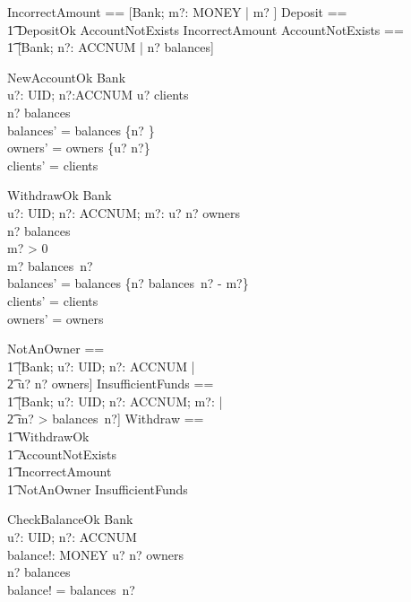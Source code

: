 \documentclass{article}
\begin{document}
\begin{zed}
IncorrectAmount == [\Xi Bank; m?: MONEY | m? ] \also
Deposit == \\
  \t1 DepositOk \lor AccountNotExists \lor IncorrectAmount \also
AccountNotExists == \\
  \t1 [\Xi Bank; n?: ACCNUM | n? \notin \dom balances] \also
\end{zed}

\begin{schema}{NewAccountOk}
\Delta Bank \\
u?: UID; 
n?:ACCNUM
\where
u? \in \dom clients \\
n? \notin \dom balances \\
balances' = balances \cup \{n? \} \\
owners' = owners \cup \{u? \mapsto n?\} \\
clients' = clients
\end{schema}

\begin{schema}{WithdrawOk}
\Delta Bank \\
u?: UID; 
n?: ACCNUM; 
m?: \nat
\where
u? \mapsto n? \in owners \\
n? \in \dom balances \\
m? > 0 \\
m? \leq balances~n? \\
balances' = balances \oplus \{n? \mapsto balances~n? - m?\} \\
clients' = clients \\
owners' = owners
\end{schema}

\begin{zed}
NotAnOwner == \\
  \t1 [\Xi Bank; u?: UID; n?: ACCNUM | \\
    \t2 u? \mapsto n? \notin owners] \also
InsufficientFunds == \\
  \t1 [\Xi Bank; u?: UID; n?: ACCNUM; m?: \nat | \\
    \t2 m? > balances~n?] \also
Withdraw == \\
  \t1 WithdrawOk \\
  \t1 \lor AccountNotExists \\ 
  \t1 \lor IncorrectAmount \\
  \t1 \lor NotAnOwner \lor InsufficientFunds
\end{zed}

\begin{schema}{CheckBalanceOk}
\Xi Bank \\
u?: UID; 
n?: ACCNUM \\
balance!: MONEY
\where
u? \mapsto n? \in owners \\
n? \in \dom balances \\
balance! = balances~n?
\end{schema}
\end{document}
